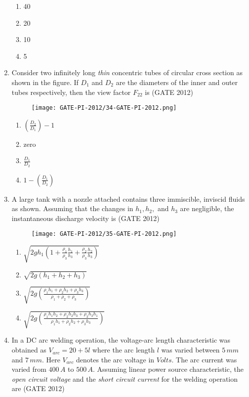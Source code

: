 \documentclass[journal,12pt,onecolumn]{IEEEtran}
\theoremstyle{remark}
\begin{document}
\begin{enumerate}
\begin{enumerate}
\item 40
\item 20
\item 10
\item 5
\end{enumerate}
\vspace{1cm}

\item Consider two infinitely long \textit{thin} concentric tubes of circular cross section as shown in the figure. If $D_1$ and $D_2$ are the diameters of the inner and outer tubes respectively, then the view factor $F_{22}$ is
\hfill{(GATE 2012)}

\begin{figure}[h!]
\centering
\texttt{[image: GATE-PI-2012/34-GATE-PI-2012.png]}
\caption{}
\label{q34}
\end{figure}

\begin{enumerate}
\item $\left(\tfrac{D_2}{D_1}\right) - 1$
\item zero
\item $\tfrac{D_1}{D_2}$
\item $1 - \left(\tfrac{D_1}{D_2}\right)$
\end{enumerate}
\vspace{1cm}

\item A large tank with a nozzle attached contains three immiscible, inviscid fluids as shown. Assuming that the changes in $h_1, h_2,$ and $h_3$ are negligible, the instantaneous discharge velocity is
\hfill{(GATE 2012)}

\begin{figure}[h!]
\centering
\texttt{[image: GATE-PI-2012/35-GATE-PI-2012.png]}
\caption{}
\label{q35}
\end{figure}

\begin{enumerate}
\item $\sqrt{2 g h_1 \left(1 + \tfrac{\rho_1}{\rho_3}\tfrac{h_1}{h_3} + \tfrac{\rho_2}{\rho_3}\tfrac{h_2}{h_3}\right)}$
\item $\sqrt{2 g (h_1 + h_2 + h_3)}$
\item $\sqrt{2 g \left(\tfrac{\rho_1 h_1 + \rho_2 h_2 + \rho_3 h_3}{\rho_1 + \rho_2 + \rho_3}\right)}$
\item $\sqrt{2 g \left(\tfrac{\rho_1 h_1 h_2 + \rho_2 h_2 h_3 + \rho_3 h_3 h_1}{\rho_1 h_1 + \rho_2 h_2 + \rho_3 h_3}\right)}$
\end{enumerate}
\vspace{1cm}
\item In a DC arc welding operation, the voltage-arc length characteristic was obtained as $V_{arc} = 20 + 5l$ where the arc length $l$ was varied between $5 \, mm$ and $7 \, mm$. Here $V_{arc}$ denotes the arc voltage in $Volts$. The arc current was varied from $400 \, A$ to $500 \, A$. Assuming linear power source characteristic, the \textit{open circuit voltage} and the \textit{short circuit current} for the welding operation are
\hfill{(GATE 2012)}


\end{enumerate}
\end{document}
